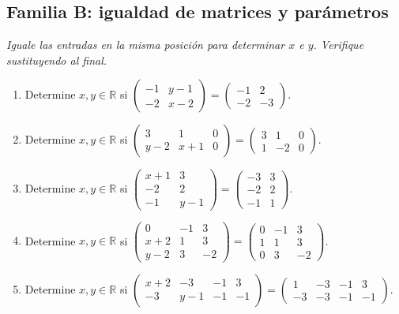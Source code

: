 \documentclass[12pt]{article}
\theoremstyle{remark}
\newcounter{contadorEjercicio}
\newenvironment{listaejercicios}{\begin{enumerate}[label=\textbf{E\arabic*.},leftmargin=2.4em,itemsep=0.52em]\setcounter{enumi}{\value{contadorEjercicio}}}{\setcounter{contadorEjercicio}{\value{enumi}}\end{enumerate}}
\begin{document}
\subsection{Familia B: igualdad de matrices y parámetros}\noindent\textit{Iguale las entradas en la misma posición para determinar $x$ e $y$. Verifique sustituyendo al final.}\par\medskip
\begin{listaejercicios}

\item Determine $x,y\in\mathbb R$ si $\begin{pmatrix}-1&y - 1\\-2&x - 2\end{pmatrix}=\begin{pmatrix}-1&2\\-2&-3\end{pmatrix}$.

\item Determine $x,y\in\mathbb R$ si $\begin{pmatrix}3&1&0\\y - 2&x + 1&0\end{pmatrix}=\begin{pmatrix}3&1&0\\1&-2&0\end{pmatrix}$.

\item Determine $x,y\in\mathbb R$ si $\begin{pmatrix}x + 1&3\\-2&2\\-1&y - 1\end{pmatrix}=\begin{pmatrix}-3&3\\-2&2\\-1&1\end{pmatrix}$.

\item Determine $x,y\in\mathbb R$ si $\begin{pmatrix}0&-1&3\\x + 2&1&3\\y - 2&3&-2\end{pmatrix}=\begin{pmatrix}0&-1&3\\1&1&3\\0&3&-2\end{pmatrix}$.

\item Determine $x,y\in\mathbb R$ si $\begin{pmatrix}x + 2&-3&-1&3\\-3&y - 1&-1&-1\end{pmatrix}=\begin{pmatrix}1&-3&-1&3\\-3&-3&-1&-1\end{pmatrix}$.


\end{listaejercicios}
\end{document}
